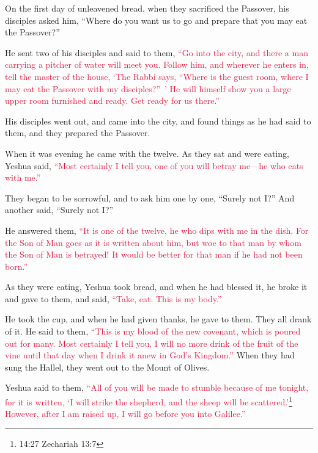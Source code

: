 \myverse{}On the first day of unleavened bread, when they sacrificed the
Passover, his disciples asked him, “Where do you want us to go and prepare that you may eat the Passover?”

\myverse{}He sent two of his disciples and said to them,
\textcolor{crimson}{“Go into the city, and there a man carrying a pitcher of water will meet you. Follow him,
}
\myverse{}\textcolor{crimson}{and wherever he enters in, tell the master of the house, ‘The Rabbi says,
	“Where is the guest room, where I may eat the Passover with my disciples?” ’
}
\myverse{}\textcolor{crimson}{He will himself show you a large upper room furnished and ready. Get
	ready for us there.”}

\myverse{}His disciples went out, and came into the city, and found things
as he had said to them, and they prepared the Passover.

\myverse{}When it was evening he came with the twelve.
\myverse{}As they sat and were eating, Yeshua said,
\textcolor{crimson}{“Most certainly I tell you, one of you will betray me—he who eats with me.”}

\myverse{}They began to be sorrowful, and to ask him one by one, “Surely
not I?” And another said, “Surely not I?”

\myverse{}He answered them,
\textcolor{crimson}{“It is one of the twelve, he who dips with me in the dish.
}
\myverse{}\textcolor{crimson}{For the Son of Man goes as it is written about him, but woe to that man
	by whom the Son of Man is betrayed! It would be better for that man if he had not been born.”}

\myverse{}As they were eating, Yeshua took bread, and when he had blessed
it, he broke it and gave to them, and said,
\textcolor{crimson}{“Take, eat. This is my body.”}

\myverse{}He took the cup, and when he had given thanks, he gave to them.
They all drank of it.
\myverse{}He said to them,
\textcolor{crimson}{“This is my blood of the new covenant, which is poured out for many.
}
\myverse{}\textcolor{crimson}{Most certainly I tell you, I will no more drink of the fruit of the vine
	until that day when I drink it anew in God’s Kingdom.”}
\myverse{}When they had sung the Hallel, they went out to the Mount of Olives.

\myverse{}Yeshua said to them,
\textcolor{crimson}{“All of you will be made to stumble because of me tonight, for it is written, ‘I will strike the shepherd,
	and the sheep will be scattered.’}\footnote{14:27 Zechariah 13:7}
\myverse{}\textcolor{crimson}{However, after I am raised up, I will go before you into Galilee.”
}

